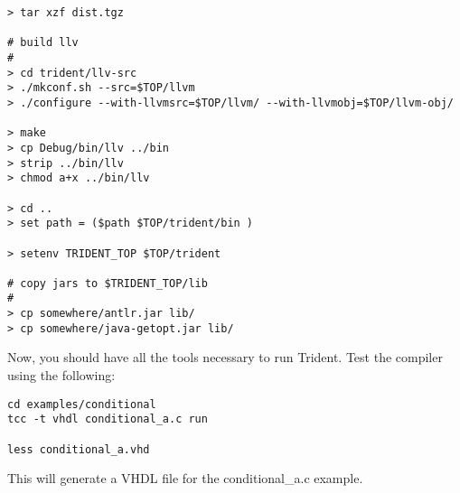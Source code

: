 \begin{verbatim}
> tar xzf dist.tgz

# build llv
# 
> cd trident/llv-src
> ./mkconf.sh --src=$TOP/llvm
> ./configure --with-llvmsrc=$TOP/llvm/ --with-llvmobj=$TOP/llvm-obj/

> make
> cp Debug/bin/llv ../bin
> strip ../bin/llv
> chmod a+x ../bin/llv

> cd ..
> set path = ($path $TOP/trident/bin )

> setenv TRIDENT_TOP $TOP/trident

# copy jars to $TRIDENT_TOP/lib
#
> cp somewhere/antlr.jar lib/
> cp somewhere/java-getopt.jar lib/
\end{verbatim}

Now, you should have all the tools necessary to run Trident.  Test the 
compiler using the following:

\begin{verbatim}
cd examples/conditional
tcc -t vhdl conditional_a.c run

less conditional_a.vhd
\end{verbatim}

This will generate a VHDL file for the conditional\_a.c example.


